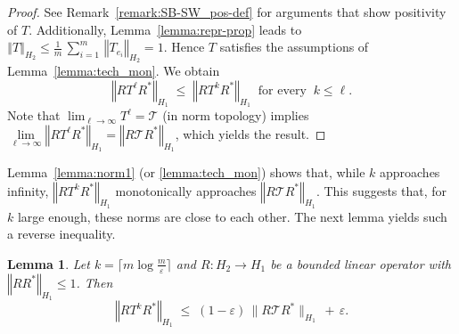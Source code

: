 \documentclass{dis}
\newtheorem{lemma}[theorem]{Lemma}
\theoremstyle{citing}
\begin{document}
\begin{proof}
See Remark~\ref{remark:SB-SW_pos-def} for arguments that 
show positivity of $T$. 
Additionally, Lemma~\ref{lemma:repr-prop} leads to 
${\left\Vert {T} \right\Vert}_{H_2}\le\frac{1}{m}\,\sum_{i=1}^m\,{\left\Vert {T_{e_i}} \right\Vert}_{H_2} 
=1$. 
Hence $T$ satisfies the assumptions of Lemma~\ref{lemma:tech_mon}. 
We obtain  
\[
{\left\Vert {R T^\ell R^*} \right\Vert}_{{H_1}} \;\le\; {\left\Vert {R T^k R^*} \right\Vert}_{{H_1}} 
\ \text{ for every }\  k\le\ell.
\]
Note that $\lim_{\ell\to\infty} T^\ell = {\mathcal{T}}$ (in norm topology) 
implies 
$\lim\limits_{\ell\to\infty}{\left\Vert {RT^\ell R^*} \right\Vert}_{H_1}={\left\Vert {R{\mathcal{T}} R^*} \right\Vert}_{H_1}$, 
which yields the result.
\end{proof}

Lemma~\ref{lemma:norm1} (or \ref{lemma:tech_mon}) shows that, 
while $k$ approaches infinity, ${\left\Vert {R T^k R^*} \right\Vert}_{H_1}$ 
monotonically approaches ${\left\Vert {R {\mathcal{T}} R^*} \right\Vert}_{H_1}$. 
This suggests that, for $k$ large enough, these norms 
are close to each other.
The next lemma yields such a reverse inequality.

\vspace{2mm}

\begin{lemma} \label{lemma:norm2}
Let $k = \lceil m \log\frac{m}{\varepsilon}\rceil$ and $R:{H_2}\to {H_1}$ be a bounded 
linear operator with ${\left\Vert {R R^*} \right\Vert}_{H_1}\le1$. Then
\[
{\left\Vert {R T^k R^*} \right\Vert}_{H_1} \;\le\; (1-{\varepsilon}) \,\bigl\|R {\mathcal{T}} R^*\bigr\|_{H_1} \,+\, {\varepsilon}.
\]
\end{lemma}
\vspace{2mm}
\end{document}
